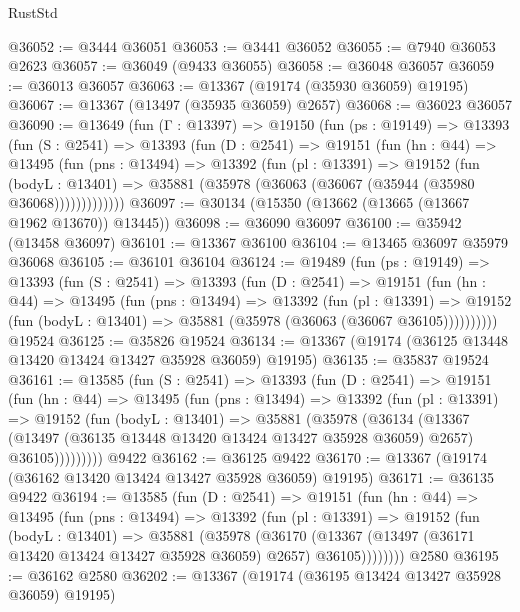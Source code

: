 \begin{lexlean}{RustStd}
\begin{coremodule}
@36052 := @3444 @36051
@36053 := @3441 @36052
@36055 := @7940 @36053 @2623
@36057 := @36049 (@9433 @36055)
@36058 := @36048 @36057
@36059 := @36013 @36057
@36063 := @13367 (@19174 (@35930 @36059) @19195)
@36067 := @13367 (@13497 (@35935 @36059) @2657)
@36068 := @36023 @36057
@36090 := @13649
    (fun (Γ : @13397) =>
    @19150
      (fun (ps : @19149) =>
      @13393
        (fun (S : @2541) =>
        @13393
          (fun (D : @2541) =>
          @19151
            (fun (hn : @44) =>
            @13495
              (fun (pns : @13494) =>
              @13392
                (fun (pl : @13391) =>
                @19152
                  (fun (bodyL : @13401) =>
                  @35881 (@35978 (@36063 (@36067 (@35944 (@35980 @36068)))))))))))))
@36097 := @30134 (@15350 (@13662 (@13665 (@13667 @1962 @13670)) @13445))
@36098 := @36090 @36097
@36100 := @35942 (@13458 @36097)
@36101 := @13367 @36100
@36104 := @13465 @36097 @35979 @36068
@36105 := @36101 @36104
@36124 := @19489
    (fun (ps : @19149) =>
    @13393
      (fun (S : @2541) =>
      @13393
        (fun (D : @2541) =>
        @19151
          (fun (hn : @44) =>
          @13495
            (fun (pns : @13494) =>
            @13392
              (fun (pl : @13391) =>
              @19152 (fun (bodyL : @13401) => @35881 (@35978 (@36063 (@36067 @36105))))))))))
    @19524
@36125 := @35826 @19524
@36134 := @13367 (@19174 (@36125 @13448 @13420 @13424 @13427 @35928 @36059) @19195)
@36135 := @35837 @19524
@36161 := @13585
    (fun (S : @2541) =>
    @13393
      (fun (D : @2541) =>
      @19151
        (fun (hn : @44) =>
        @13495
          (fun (pns : @13494) =>
          @13392
            (fun (pl : @13391) =>
            @19152
              (fun (bodyL : @13401) =>
              @35881
                (@35978
                  (@36134
                    (@13367
                      (@13497 (@36135 @13448 @13420 @13424 @13427 @35928 @36059) @2657)
                      @36105)))))))))
    @9422
@36162 := @36125 @9422
@36170 := @13367 (@19174 (@36162 @13420 @13424 @13427 @35928 @36059) @19195)
@36171 := @36135 @9422
@36194 := @13585
    (fun (D : @2541) =>
    @19151
      (fun (hn : @44) =>
      @13495
        (fun (pns : @13494) =>
        @13392
          (fun (pl : @13391) =>
          @19152
            (fun (bodyL : @13401) =>
            @35881
              (@35978
                (@36170
                  (@13367 (@13497 (@36171 @13420 @13424 @13427 @35928 @36059) @2657) @36105))))))))
    @2580
@36195 := @36162 @2580
@36202 := @13367 (@19174 (@36195 @13424 @13427 @35928 @36059) @19195)

\end{coremodule}
\end{lexlean}
